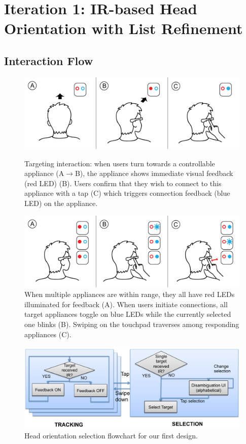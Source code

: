 \section{Iteration 1: IR-based Head Orientation with List Refinement}

\subsection{Interaction Flow}

\begin{figure}[t!]
\centering
\includegraphics[width=\columnwidth]{figures/stepbystep_small.png}
\caption{Targeting interaction: when users turn towards a controllable appliance (A$\rightarrow$B), the appliance shows immediate visual feedback (red LED) (B). Users confirm that they wish to connect to this appliance with a tap (C) which triggers connection feedback (blue LED) on the appliance.}
\label{fig:interaction}
\vspace{0.1in}
\includegraphics[width=\columnwidth]{figures/stepbystep_multi_small.png}
\caption{When multiple appliances are within range, they all have red LEDs illuminated for feedback (A). When users initiate connections, all target appliances toggle on blue LEDs while the currently selected one blinks (B). Swiping on the touchpad traverses among responding appliances (C).}
\label{fig:interaction_multi}
\end{figure}

\begin{figure}[t]
\centering
\includegraphics[width=1.0\columnwidth]{figures/selectflow01.pdf}
\caption{Head orientation selection flowchart for our first design.}
\label{fig:selectflow01}
\end{figure}

